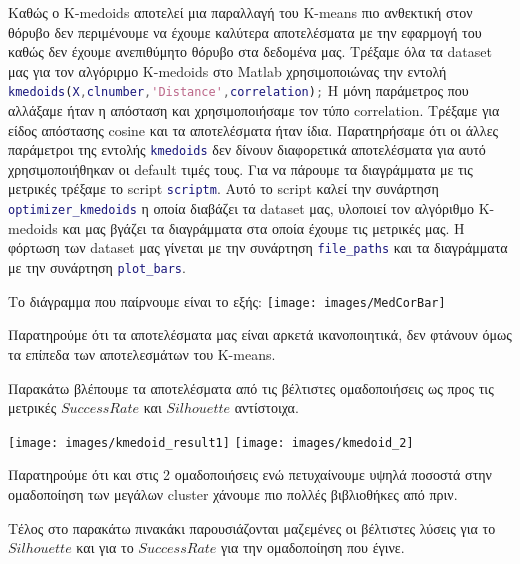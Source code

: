 Καθώς ο K-medoids αποτελεί μια παραλλαγή του K-means πιο ανθεκτική στον θόρυβο δεν περιμένουμε να έχουμε καλύτερα αποτελέσματα με την εφαρμογή του καθώς δεν έχουμε ανεπιθύμητο θόρυβο στα δεδομένα μας. Τρέξαμε όλα τα dataset μας για τον αλγόριρμο K-medoids στο Matlab χρησιμοποιώνας την εντολή \lstinline[language=MATLAB]!kmedoids(X,clnumber,'Distance',correlation);!
Η μόνη παράμετρος που αλλάξαμε ήταν η απόσταση και χρησιμοποιήσαμε τον τύπο correlation. Τρέξαμε για είδος απόστασης cosine και τα αποτελέσματα ήταν ίδια. Παρατηρήσαμε ότι οι άλλες παράμετροι της εντολής \lstinline[language=MATLAB]!kmedoids! δεν δίνουν διαφορετικά αποτελέσματα για αυτό χρησιμοποιήθηκαν οι default τιμές τους. Για να πάρουμε τα διαγράμματα με τις μετρικές τρέξαμε το script  \lstinline[language=MATLAB]!scriptm!. Αυτό το script καλεί την συνάρτηση \lstinline[language=MATLAB]!optimizer_kmedoids! η οποία διαβάζει τα dataset μας, υλοποιεί τον αλγόριθμο K-medoids και μας βγάζει τα διαγράμματα στα οποία έχουμε τις μετρικές μας. Η φόρτωση των dataset μας γίνεται με την συνάρτηση \lstinline[language=MATLAB]!file_paths! και τα διαγράμματα με την συνάρτηση \lstinline[language=MATLAB]!plot_bars!.

Το διάγραμμα που παίρνουμε είναι το εξής:
\texttt{[image: images/MedCorBar]}

Παρατηρούμε ότι τα αποτελέσματα μας είναι αρκετά ικανοποιητικά, δεν φτάνουν όμως τα επίπεδα των αποτελεσμάτων του K-means.

Παρακάτω βλέπουμε τα αποτελέσματα από τις βέλτιστες ομαδοποιήσεις ως προς τις μετρικές $SuccessRate$ και $Silhouette$ αντίστοιχα.
\noindent\begin{minipage}{\linewidth}
    \centering
    \texttt{[image: images/kmedoid\_result1]}
    \texttt{[image: images/kmedoid\_2]}
    \label{fig:kmedoid_result}
\end{minipage}

Παρατηρούμε ότι και στις 2 ομαδοποιήσεις ενώ πετυχαίνουμε υψηλά ποσοστά στην ομαδοποίηση των μεγάλων cluster χάνουμε πιο πολλές βιβλιοθήκες από πριν.

Τέλος στο παρακάτω πινακάκι παρουσιάζονται μαζεμένες οι βέλτιστες λύσεις για το $Silhouette$ και για το $Success Rate$ για την ομαδοποίηση που έγινε.
\begin{table}[]
	\centering
	\caption{K-medoids Best Results}
	\label{table:k-medoids-best}
\end{table}